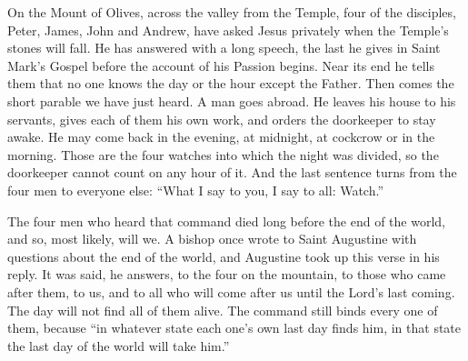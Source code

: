 %

On the Mount of Olives, across the valley from the Temple, four of the
disciples, Peter, James, John and Andrew, have asked Jesus privately when the
Temple's stones will fall. He has answered with a long speech, the last he
gives in Saint Mark's Gospel before the account of his Passion begins. Near
its end he tells them that no one knows the day or the hour except the
Father. Then comes the short parable we have just heard. A man goes abroad.
He leaves his house to his servants, gives each of them his own work, and
orders the doorkeeper to stay awake. He may come back in the evening, at
midnight, at cockcrow or in the morning. Those are the four watches into
which the night was divided, so the doorkeeper cannot count on any hour of
it. And the last sentence turns from the four men to everyone else: ``What I
say to you, I say to all: Watch.''

The four men who heard that command died long before the end of the world,
and so, most likely, will we. A bishop once wrote to Saint Augustine with
questions about the end of the world, and Augustine took up this verse in
his reply. It was said, he answers, to the four on the mountain, to those who
came after them, to us, and to all who will come after us until the Lord's
last coming. The day will not find all of them alive. The command still binds
every one of them, because ``in whatever state each one's own last day finds
him, in that state the last day of the world will take him.''

